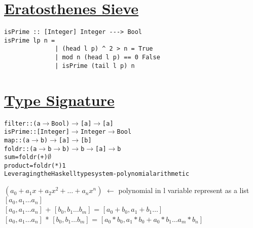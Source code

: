 \documentclass{article}
\begin{document}
\begin{flushleft}
\begin{flushleft}
\begin{flushleft}
\section*{\underline{Eratosthenes Sieve}}
\begin{verbatim}
isPrime :: [Integer] Integer ---> Bool
isPrime lp n =
              | (head l p) ^ 2 > n = True
              | mod n (head l p) == 0 False
              | isPrime (tail l p) n
\end{verbatim}
\vspace*{0.5cm}

\section*{\underline{Type Signature}}
\begin{flushleft}
\begin{alltt}
filter :: (a \(\rightarrow\) Bool) \(\rightarrow\) [a] \(\rightarrow\) [a] \\
isPrime :: [Integer] \(\rightarrow\) Integer \(\rightarrow\) Bool\\
map :: (a \(\rightarrow\) b) \(\rightarrow\) [a] \(\rightarrow\) [b] \\
foldr :: (a \(\rightarrow\) b \(\rightarrow\) b) \(\rightarrow\) b \(\rightarrow\) [a] \(\rightarrow\) b \\
sum = foldr (+) \(\emptyset\)
product = foldr (*) 1 \\
Leveraging the Haskell type system - polynomial arithmetic
\end{alltt}
\bigskip
$ ({a}_{0} + {a}_{1}x + {a}_{2}{x}^{2} + \ldots + {a}_{n}{x}^{n})$ $\leftarrow$ polynomial in l variable represent as a list $[{a}_{0}, {a}_{1} \ldots {a}_{n}]$\\
\bigskip
$[{a}_{0}, {a}_{1} \ldots {a}_{n}]$ + $[{b}_{0}, {b}_{1} \ldots {b}_{m}]$ = $[{a}_{0} + {b}_{0}, {a}_{1} + {b}_{1} \ldots]$\\
\bigskip
$[{a}_{0}, {a}_{1} \ldots {a}_{n}]$ * $[{b}_{0}, {b}_{1} \ldots {b}_{m}]$ = $[{a}_{0} * {b}_{0}, {a}_{1} * {b}_{0} + {a}_{0} * {b}_{1} \ldots {a}_{m} * {b}_{n}]$
\end{flushleft}
\end{flushleft}
\end{flushleft}
\end{flushleft}
\end{document}
